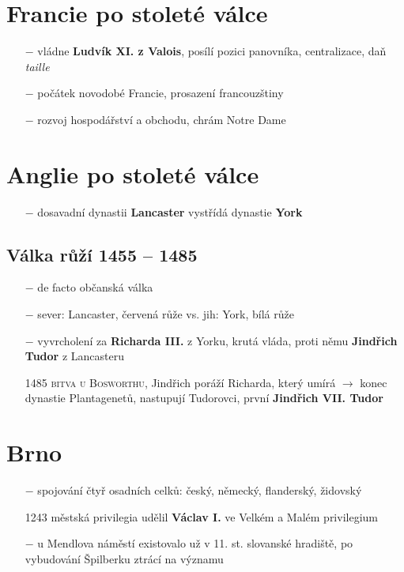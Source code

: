 \documentclass{article}
\begin{document}
\section*{Francie po stoleté válce}
\begin{itemize}
    \vspace{-0.5em}
    \setlength\itemsep{0.15em}
    \item[$-$] vládne \textbf{Ludvík XI. z Valois}, posílí pozici panovníka, centralizace, daň \textit{taille}
    \item[$-$] počátek novodobé Francie, prosazení francouzštiny
    \item[$-$]rozvoj hospodářství a obchodu, chrám Notre Dame
\end{itemize}


\section*{Anglie po stoleté válce}
\begin{itemize}
    \vspace{-0.5em}
    \setlength\itemsep{0.15em}
    \item[$-$] dosavadní dynastii \textbf{Lancaster} vystřídá dynastie \textbf{York}
\end{itemize}

\subsection*{Válka růží 1455 -- 1485}
\begin{itemize}
    \vspace{-0.5em}
    \setlength\itemsep{0.15em}
    \item[$-$] de facto občanská válka
    \item[$-$] sever: Lancaster, červená růže vs. jih: York, bílá růže
    \item[$-$] vyvrcholení za \textbf{Richarda III.} z Yorku, krutá vláda, proti němu \textbf{Jindřich Tudor} z Lancasteru
    \item[1485] \textsc{bitva u Bosworthu}, Jindřich poráží Richarda, který umírá $\rightarrow$ konec dynastie Plantagenetů, nastupují Tudorovci, první \textbf{Jindřich VII. Tudor}
\end{itemize}


\section*{Brno}
\begin{itemize}
    \vspace{-0.5em}
    \setlength\itemsep{0.15em}
    \item[$-$] spojování čtyř osadních celků: český, německý, flanderský, židovský
    \item[1243] městská privilegia udělil \textbf{Václav I.} ve Velkém a Malém privilegium
    \item[$-$] u Mendlova náměstí existovalo už v 11. st. slovanské hradiště, po vybudování Špilberku ztrácí na významu
\end{itemize}
\end{document}
